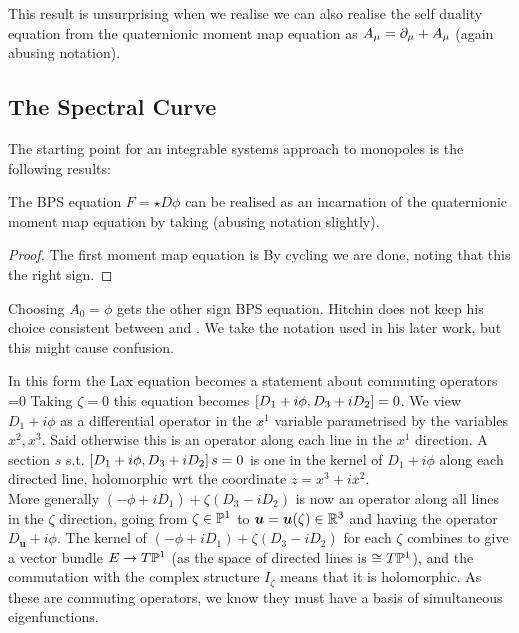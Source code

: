 \documentclass{article}
\begin{document}
\begin{remark}
	This result is unsurprising when we realise we can also realise the self duality equation from the quaternionic moment map equation as $A_\mu = \del_\mu + A_\mu$ (again abusing notation). 
\end{remark}

\subsection{The Spectral Curve}
The starting point for an integrable systems approach to monopoles is the following results:
\begin{prop}
The BPS equation $F = \star D \phi$ can be realised as an incarnation of the quaternionic moment map equation by taking 
(abusing notation slightly).
\end{prop}
\begin{proof}
	The first moment map equation is 
By cycling we are done, noting that this the right sign. 
\end{proof}
\begin{remark}
	Choosing $A_0=\phi$ gets the other sign BPS equation. Hitchin does not keep his choice consistent between \cite{Hitchin1987} and \cite{Hitchin1982,Hitchin1983}. We take the notation used in his later work, but this might cause confusion.   
\end{remark}
 In this form the Lax equation becomes a statement about commuting operators 
\be\label{eq: BPS lax equation}
	=0	
\ee
Taking $\zeta=0$ this equation becomes $\comm[D_1+i\phi]{D_3+iD_2}=0$. We view $D_1+i\phi$ as a differential operator in the $x^1$ variable parametrised by the variables $x^2, x^3$. Said otherwise this is an operator along each line in the $x^1$ direction. A section $s$ s.t. $\comm[D_1+i\phi]{D_3+iD_2}s=0$ is one in the kernel of $D_1+i\phi$ along each directed line, holomorphic wrt the coordinate $z=x^3+ix^2$. \\
More generally $(-\phi+iD_1) +\zeta(D_3-iD_2)$ is now an operator along all lines in the $\zeta$ direction, going from $\zeta\in \mbb{P}^1$ to $\bm{u} = \bm{u}(\zeta) \in \mbb{R}^3$ and having the operator $D_{\bm{u}}+i\phi$. The kernel of $(-\phi+iD_1) +\zeta(D_3-iD_2)$ for each $\zeta$ combines to give a vector bundle $E \to T\mbb{P}^1$ (as the space of directed lines is $\cong T\mbb{P}^1$), and the commutation with the complex structure $I_\zeta$ means that it is holomorphic. As these are commuting operators, we know they must have a basis of simultaneous eigenfunctions. \\
\end{document}

